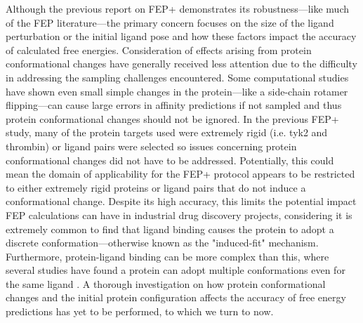 \documentclass[journal=jctcce,manuscript=article]{achemso}
\begin{document}
Although the previous report on FEP+\cite{FEPplus} demonstrates its robustness---like much of the FEP literature---the primary concern focuses on the size of the ligand perturbation or the initial ligand pose and how these factors impact the accuracy of calculated free energies.\cite{mobley2012perspective,doi:10.1021/acs.jctc.5b00214}
Consideration of effects arising from protein conformational changes have generally received less attention due to the difficulty in addressing the sampling challenges encountered.
Some computational studies have shown even small simple changes in the protein---like a side-chain rotamer flipping---can cause large errors in affinity predictions if not sampled\cite{Mobley2009489,Mobley20071118} and thus protein conformational changes should not be ignored.
In the previous FEP+ study\cite{FEPplus}, many of the protein targets used were extremely rigid (i.e. tyk2 and thrombin) or ligand pairs were selected so issues concerning protein conformational changes did not have to be addressed.
Potentially, this could mean the domain of applicability for the FEP+ protocol appears to be restricted to either extremely rigid proteins or ligand pairs that do not induce a conformational change.
Despite its high accuracy, this limits the potential impact FEP calculations can have in industrial drug discovery projects, considering it is extremely common to find that ligand binding causes the protein to adopt a discrete conformation---otherwise known as the "induced-fit" mechanism.
Furthermore, protein-ligand binding can be more complex than this, where several studies have found a protein can adopt multiple conformations even for the same ligand \cite{doi:10.1021/jm060167o,Gutteridge200521,Merski2015}.
A thorough investigation on how protein conformational changes and the initial protein configuration affects the accuracy of free energy predictions has yet to be performed, to which we turn to now.
\end{document}
